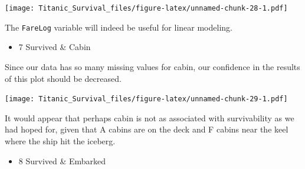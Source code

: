 \documentclass[]{article}
\newenvironment{Shaded}{\begin{snugshade}}{\end{snugshade}}
\newcommand{\KeywordTok}[1]{\textcolor[rgb]{0.13,0.29,0.53}{\textbf{#1}}}
\newcommand{\DataTypeTok}[1]{\textcolor[rgb]{0.13,0.29,0.53}{#1}}
\newcommand{\DecValTok}[1]{\textcolor[rgb]{0.00,0.00,0.81}{#1}}
\newcommand{\StringTok}[1]{\textcolor[rgb]{0.31,0.60,0.02}{#1}}
\newcommand{\CommentTok}[1]{\textcolor[rgb]{0.56,0.35,0.01}{\textit{#1}}}
\newcommand{\OperatorTok}[1]{\textcolor[rgb]{0.81,0.36,0.00}{\textbf{#1}}}
\newcommand{\NormalTok}[1]{#1}
\providecommand{\tightlist}{%
  \setlength{\itemsep}{0pt}\setlength{\parskip}{0pt}}
\begin{document}
\texttt{[image: Titanic\_Survival\_files/figure-latex/unnamed-chunk-28-1.pdf]}

The \texttt{FareLog} variable will indeed be useful for linear modeling.

\begin{itemize}
\tightlist
\item
  7 Survived \& Cabin
\end{itemize}

Since our data has so many missing values for cabin, our confidence in
the results of this plot should be decreased.

\begin{Shaded}
\end{Shaded}

\texttt{[image: Titanic\_Survival\_files/figure-latex/unnamed-chunk-29-1.pdf]}

It would appear that perhaps cabin is not as associated with
survivability as we had hoped for, given that A cabins are on the deck
and F cabins near the keel where the ship hit the iceberg.

\begin{itemize}
\tightlist
\item
  8 Survived \& Embarked
\end{itemize}
\end{document}
